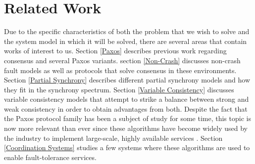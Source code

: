 \chapter{Related Work} \label{Related Work}

Due to the specific characteristics of both the problem that we wish to solve and the system model in which it will be solved, there are several areas that contain works of interest to us. Section \ref{Paxos} describes previous work regarding consensus and several Paxos variants. section \ref{Non-Crash} discusses non-crash fault models as well as protocols that solve consensus in these environments. Section \ref{Partial Synchrony} describes different partial synchrony models and how they fit in the synchrony spectrum. Section \ref{Variable Consistency} discusses variable consistency models that attempt to strike a balance between strong and weak consistency in order to obtain advantages from both. Despite the fact that the Paxos protocol family has been a subject of study for some time, this topic is now more relevant than ever since these algorithms have become widely used by the industry to implement large-scale, highly available services \cite{Burrows2006,Hunt2010}. Section \ref{Coordination Systems} studies a few systems where these algorithms are used to enable fault-tolerance services.

